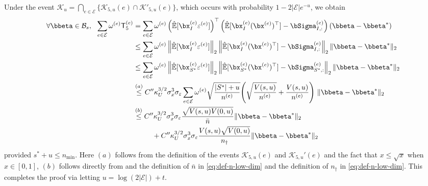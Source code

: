 \documentclass[10pt]{article}
\numberwithin{equation}{section}
\begin{document}
Under the event $\mathcal{K}_u = \bigcap_{e\in \mathcal{E}} \{\mathcal{K}_{5,u}(e) \cap \mathcal{K}'_{5,u}(e)\}$, which occurs with probability $1-2|\mathcal{E}| e^{-u}$, we obtain
\begin{align*}
    \forall \bbeta \in \mathcal{B}_s, ~~\sum_{e\in \mathcal{E}} \omega^{(e)} \mathsf{T}_5^{(e)} &= \sum_{e\in \mathcal{E}} \omega^{(e)} \left(\hat{\mathbb{E}}[\bx_I^{(e)}\varepsilon^{(e)}]\right)^\top \left(\hat{\mathbb{E}}[\bx_{I}^{(e)} (\bx^{(e)})^\top] - \bSigma^{(e)}_{I,:}\right) \left(\bbeta - \bbeta^*\right) \\
    &\le \sum_{e\in \mathcal{E}} \omega^{(e)} \left\|\hat{\mathbb{E}}[\bx_I^{(e)}\varepsilon^{(e)}]\right\|_2 \left\|\hat{\mathbb{E}}[\bx_{I}^{(e)} (\bx^{(e)})^\top] - \bSigma^{(e)}_{I,:}\right\|_2 \|\bbeta - \bbeta^*\|_2 \\
    &\le \sum_{e\in \mathcal{E}} \omega^{(e)} \left\|\hat{\mathbb{E}}[\bx_{S^*}^{(e)}\varepsilon^{(e)}]\right\|_2 \left\|\hat{\mathbb{E}}[\bx_{S^*}^{(e)} (\bx^{(e)})^\top] - \bSigma^{(e)}_{S^*,:}\right\|_2 \|\bbeta - \bbeta^*\|_2 \\ 
    &\overset{(a)}{\le} C'' \kappa_U^{3/2} \sigma_x^3 \sigma_\varepsilon \sum_{e\in \mathcal{E}} \omega^{(e)} \sqrt{\frac{|S^*| + u}{n^{(e)}}} \Bigg(\sqrt{\frac{V(s, u)}{n^{(e)}}} + \frac{V(s,u)}{n^{(e)}} \Bigg) ~ \|\bbeta - \bbeta^*\|_2 \\
    &\overset{(b)}{\le} C'' \kappa_U^{3/2} \sigma_x^3 \sigma_\varepsilon \frac{\sqrt{V(s,u) V(0,u)}}{\bar{n}} \|\bbeta - \bbeta^*\|_2 \\
    &~~~~~~~~ + C'' \kappa_U^{3/2} \sigma_x^3 \sigma_\varepsilon \frac{V(s,u)\sqrt{V(0,u)}}{n_\dagger} \|\bbeta - \bbeta^*\|_2
\end{align*} provided $s^* + u \le n_{\min}$. Here $(a)$ follows from the definition of the events $\mathcal{K}_{5,u}(e)$ and $\mathcal{K}_{5,u}'(e)$ and the fact that $x \le \sqrt{x}$ when $x\in [0,1]$, $(b)$ follows directly from and the definition of $\bar{n}$ in \eqref{eq:def-n-low-dim} and the definition of $n_\dagger$ in \eqref{eq:def-n-low-dim}. This completes the proof via letting $u = \log(2|\mathcal{E}|) + t$.
\end{document}
